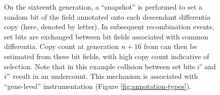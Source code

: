 \begin{figure}
\begin{minipage}{\textwidth}
{      On the sixteenth generation, a ``snapshot'' is performed to set a random bit of the field annotated onto each descendant differentia copy (here, denoted by letter).
      In subsequent recombination events, set bits are exchanged between bit fields associated with common differentia.
      Copy count at generation $n + 16$ from can then be estimated from these bit fields, with high copy count indicative of selection.
      Note that in this example collision between set bits $i'$ and $i"$ result in an undercount.
      This mechanism is associated with ``gene-level'' instrumentation (Figure \ref{fig:annotation-types}).
    }
    \label{fig:ne-example-replicates}
  \end{minipage}

\end{figure}


%
%
%
